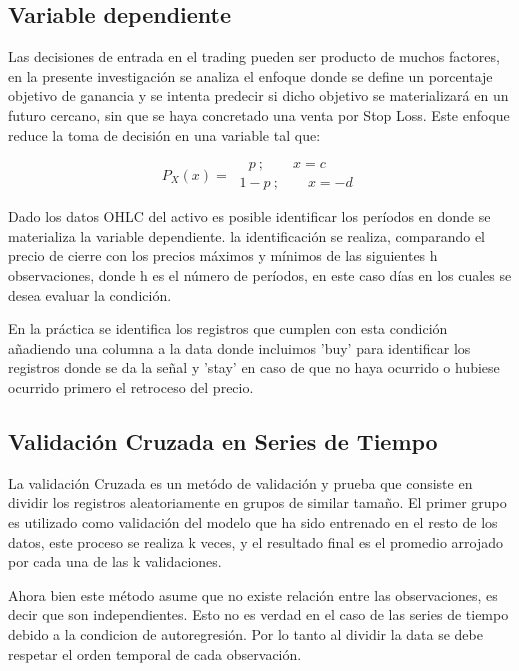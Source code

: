 \documentclass[a4paper,12pt]{Latex/Classes/PhDthesisPSnPDF}
\begin{document}
\subsection{Variable dependiente}

Las decisiones de entrada en el trading pueden ser producto de muchos factores, en la presente investigación se analiza el enfoque donde se define un porcentaje objetivo de ganancia y se intenta predecir si dicho objetivo se materializará en un futuro cercano, sin que se haya concretado una venta por Stop Loss. Este enfoque reduce la toma de decisión en una variable tal que:

$$
P_{X}(x) = 
\begin{array}{ll} 
\ \ \ \ p \ ; \qquad x = c
\\
\ 1-p \ ; \qquad x = -d
\end{array}
$$

Dado los datos OHLC del activo es posible identificar los períodos en donde se materializa la variable dependiente. la identificación se realiza, comparando el precio de cierre con los precios máximos y mínimos de las siguientes h observaciones, donde h es el número de períodos, en este caso días en los cuales se desea evaluar la condición.

En la práctica se identifica los registros que cumplen con esta condición añadiendo una columna a la data donde incluimos 'buy' para identificar los registros donde se da la señal y 'stay' en caso de que no haya ocurrido o hubiese ocurrido primero el retroceso del precio.

\subsection{Validación Cruzada en Series de Tiempo}

La validación Cruzada es un metódo de validación y prueba que consiste en dividir los registros aleatoriamente en grupos de similar tamaño. El primer grupo es utilizado como validación del modelo que ha sido entrenado en el resto de los datos, este proceso se realiza k veces, y el resultado final es el promedio arrojado por cada una de las k validaciones.

Ahora bien este método asume que no existe relación entre las observaciones, es decir que son independientes. Esto no es verdad en el caso de las series de tiempo debido a la condicion de autoregresión. Por lo tanto al dividir la data se debe respetar el orden temporal de cada observación. 
\end{document}

